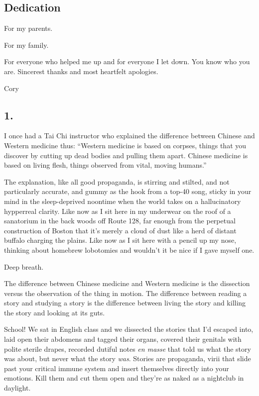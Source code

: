 \subsection{Dedication}
{
\setlength{\parindent}{0pt}
\addtolength{\parskip}{0.5\baselineskip}

For my parents.

For my family.

For everyone who helped me up and for everyone I let down. You know
who you are. Sincerest thanks and most heartfelt apologies.

Cory
}

\subsection{1.}

I once had a Tai Chi instructor who explained the difference
between Chinese and Western medicine thus: “Western medicine is
based on corpses, things that you discover by cutting up dead
bodies and pulling them apart. Chinese medicine is based on living
flesh, things observed from vital, moving humans.”

The explanation, like all good propaganda, is stirring and stilt\-ed,
and not particularly accurate, and gummy as the hook from a top-40
song, sticky in your mind in the sleep-deprived noontime when the
world takes on a hallucinatory hypperreal clarity. Like now as I
sit here in my underwear on the roof of a sanatorium in the back
woods off Route 128, far enough from the perpetual construction of
Boston that it’s merely a cloud of dust like a herd of distant
buffalo charging the plains. Like now as I sit here with a pencil
up my nose, thinking about homebrew lobotomies and wouldn’t it be
nice if I gave myself one.

Deep breath.

The difference between Chinese medicine and Western medicine is the
dissection versus the observation of the thing in motion. The
difference between reading a story and studying a story is the
difference between living the story and killing the story and
looking at its guts.

School! We sat in English class and we dissected the stories that
I’d escaped into, laid open their abdomens and tagged their organs,
covered their genitals with polite sterile drapes, recorded dutiful
notes \emph{en masse} that told us what the story was about, but
never what the story \emph{was}. Stories are propaganda, virii that
slide past your critical immune system and insert themselves
directly into your emotions. Kill them and cut them open and
they’re as naked as a nightclub in daylight.

